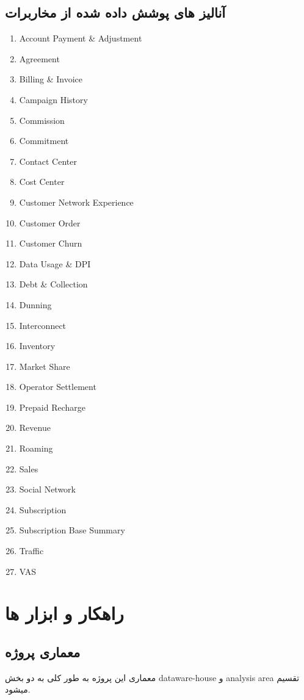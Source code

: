 \documentclass{llncs}
\begin{document}
\subsection{آنالیز های پوشش داده شده از مخاربرات}
\begin{enumerate}
    \item Account Payment \& Adjustment
    \item Agreement
    \item Billing \& Invoice
    \item Campaign History
    \item Commission
    \item Commitment
    \item Contact Center
    \item Cost Center
    \item Customer Network Experience
    \item Customer Order
    \item Customer Churn
    \item Data Usage \& DPI
    \item Debt \& Collection
    \item Dunning
    \item Interconnect
    \item Inventory
    \item Market Share
    \item Operator Settlement
    \item Prepaid Recharge
    \item Revenue
    \item Roaming
    \item Sales
    \item Social Network
    \item Subscription
    \item Subscription Base Summary
    \item Traffic
    \item VAS
\end{enumerate}


\section {راهکار و ابزار ها}
\subsection{معماری پروژه }
معماری این پروژه به طور کلی به دو بخش dataware-house و analysis area تقسیم میشود.
\end{document}
